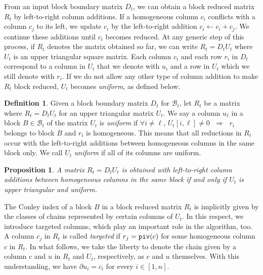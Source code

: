 \documentclass[letterpaper,11pt]{article}
\theoremstyle{plain}
\newtheorem{proposition}[theorem]{Proposition}
\theoremstyle{definition}
\newtheorem{definition}[theorem]{Definition}
\def\implies{\;\Rightarrow\;}
\newcounter{li}
\newcommand\michal[1]{\textcolor{ForestGreen}{[ML: #1]}}
\newcommand{\low}{{\tt piv}}
\newcommand{\md}{\mathcal{B}}
\begin{document}
From an input block boundary matrix $D_t$, we can obtain a block reduced matrix
$R_t$ by left-to-right column additions.
If a homogeneous column $c_i$ conflicts with a column $c_j$ to its left,
we update $c_i$ by the left-to-right addition $c_i\leftarrow c_i+c_j$. We continue
these additions until $c_i$ becomes reduced. At any generic step of this process,
if $R_t$ denotes the matrix obtained so far, we can write $R_t=D_tU_t$ where $U_t$ is an upper triangular square matrix. 
Each column $c_i$ and each row $r_i$ in $D_t$
    correspond to a column in $U_t$ that we denote with $u_i$ and a row in $U_t$ which we still denote with $r_i$.
If we do not allow any other type of column addition to make
$R_t$ block reduced, $U_t$ becomes \emph{uniform}, as defined below. 

 \begin{definition}
		Given a block boundary matrix $D_t$ for $\md_{t}$, let $R_t$ be a matrix where $R_t=D_tU_t$ for an upper triangular matrix $U_t$. We say a column $u_\ell$ in a block $B\in \md_t$ of the matrix $U_t$ is \emph{uniform} if $\forall i\not=\ell$,
        $U_t[i,\ell]\not=0$ $\implies$ $r_i$ belongs to block $B$ and $r_i$ is homogeneous.
        This means that all reductions in $R_t$ occur with the left-to-right additions between homogeneous columns in the same block only. We call $U_t$ \emph{uniform} if all of its columns are uniform.
 \end{definition}
\begin{proposition}
        A matrix $R_t=D_tU_t$ is obtained with left-to-right column additions between
        homogeneous columns in the same block if and only if $U_t$ is upper triangular and uniform.
        \label{prop:umatrix}
\end{proposition}

The Conley index of a block $B$ in a block reduced matrix $R_t$ is implicitly
given by the classes of chains represented by certain columns of $U_t$. 
In this
respect, we introduce targeted columns, which play an important role in the algorithm, too. A column $c_j$ in $R_t$ is called \emph{targeted} if $r_j=\low(c)$ for
some homogeneous column $c$ in $R_t$. In what follows, we take the liberty to denote
the chain given by a column $c$ and $u$ in $R_t$ and $U_t$, respectively, as $c$ and $u$ themselves. 
With this understanding, we have $\partial u_i=c_i$ for every $i\in [1,n]$.
\end{document}
